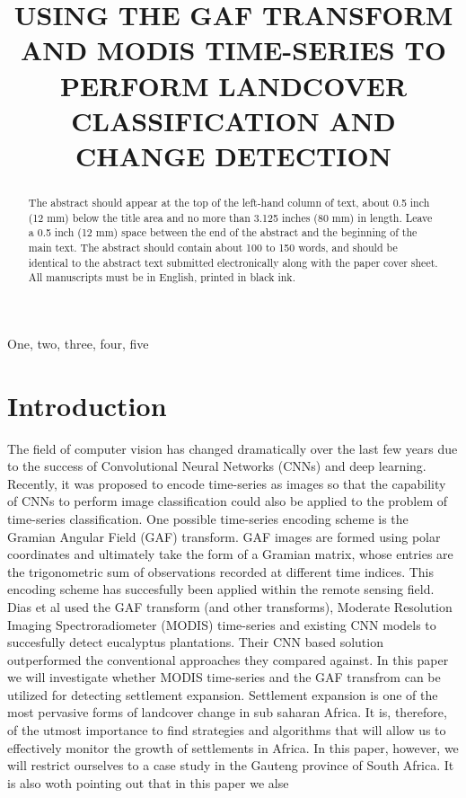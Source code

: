 \documentclass{article}
\title{USING THE GAF TRANSFORM AND MODIS TIME-SERIES TO PERFORM LANDCOVER CLASSIFICATION AND CHANGE DETECTION}
\begin{document}
%
\maketitle
%
\begin{abstract}
The abstract should appear at the top of the left-hand column of text, about
0.5 inch (12 mm) below the title area and no more than 3.125 inches (80 mm) in
length.  Leave a 0.5 inch (12 mm) space between the end of the abstract and the
beginning of the main text.  The abstract should contain about 100 to 150
words, and should be identical to the abstract text submitted electronically
along with the paper cover sheet.  All manuscripts must be in English, printed
in black ink.
\end{abstract}
%
\begin{keywords}
One, two, three, four, five
\end{keywords}
%
\section{Introduction}
\label{sec:intro}
The field of computer vision has changed dramatically over the last few years due to the success of Convolutional Neural Networks (CNNs) and deep learning. Recently, it was proposed to encode time-series as images so that the capability of CNNs to perform image classification could also be applied to the problem of time-series classification. One possible time-series encoding scheme is the Gramian Angular Field (GAF) transform. GAF images are formed using polar coordinates and ultimately take the form of a Gramian matrix, whose entries are the trigonometric sum of observations recorded at different time indices. This encoding scheme has succesfully been applied within the remote sensing field. Dias et al used the GAF transform (and other transforms), Moderate Resolution Imaging Spectroradiometer (MODIS) time-series and existing CNN models to succesfully detect eucalyptus plantations. Their CNN based solution outperformed the conventional approaches they compared against. In this paper we will investigate whether MODIS time-series and the GAF transfrom can be utilized for detecting settlement expansion. Settlement expansion is one of the most pervasive forms of landcover change in sub saharan Africa. It is, therefore, of the utmost importance to find strategies and algorithms that will allow us to effectively monitor the growth of settlements in Africa. In this paper, however, we will restrict ourselves to a case study in the Gauteng province of South Africa. It is also woth pointing out that in this paper we alse  
\end{document}
